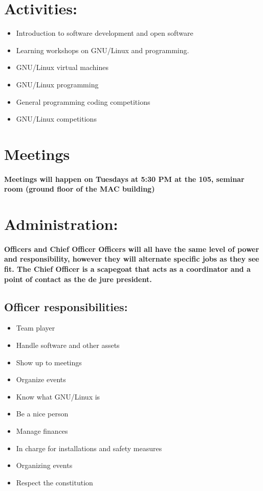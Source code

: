 \documentclass[a4paper, 11pt]{amsart}
\begin{document}
\section{Activities:}
\begin{itemize}
    \item Introduction to software development and open software
  \item Learning workshops on GNU/Linux and programming.
  \item GNU/Linux virtual machines
  \item GNU/Linux programming
  \item General programming coding competitions
  \item GNU/Linux competitions
\end{itemize}




\section{Meetings}
\paragraph{Meetings will happen on Tuesdays at 5:30 PM at the 105, seminar room (ground floor of the MAC building)}




\section{Administration:}
\paragraph{Officers and Chief Officer
    Officers will all have the same level of power and responsibility, however they will alternate specific jobs as they see fit.
    The Chief Officer is a scapegoat that acts as a coordinator and a point of contact as the de jure president.
}
\subsection{Officer responsibilities:}
\begin{itemize}
    \item Team player
    \item Handle software and other assets
    \item Show up to meetings
    \item Organize events
    \item Know what GNU/Linux is
    \item Be a nice person
    \item Manage finances
    \item In charge for installations and safety measures
    \item  Organizing events
    \item Respect the constitution
\end{itemize}
\end{document}
